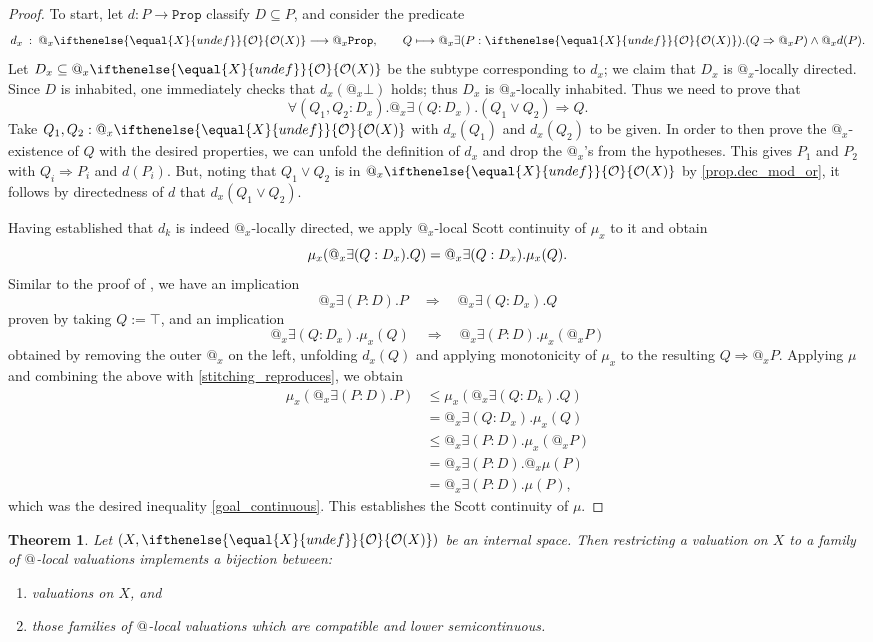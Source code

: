 \documentclass[reqno,11pt]{amsproc}
\makeatletter
\theoremstyle{plain}
\newtheorem{theorem}{Theorem}[section]
\theoremstyle{definition}
\newcommand{\Const}[1]{\mathtt{#1}}
\renewcommand{\to}[1][]{\xrightarrow{#1}}
\newcommand{\prop}{\Const{Prop}}
\newcommand{\pt}{x}
\newcommand{\Op}[1][undef]{\ifthenelse{\equal{#1}{undef}}{\mathcal{O}}{\mathcal{O}(#1)}}
\newcommand{\atsymbol}{{@}}
\newcommand{\at}[1][\pt]{\atsymbol_{#1}}
\newcommand{\imp}{\Rightarrow}
\let\originalleft\left
\let\originalright\right
\renewcommand{\left}{\mathopen{}\mathclose\bgroup\originalleft}
\renewcommand{\right}{\aftergroup\egroup\originalright}
\numberwithin{equation}{section}
\makeatother
\begin{document}
\begin{proof}
To start, let $d\colon P\to\prop$ classify $D\subseteq P$, and consider the predicate
	\[
		d_\pt \: : \: \at \Op[X] \longrightarrow \at \prop, \qquad Q \longmapsto \at \exists (P : \Op[X]) . (Q \imp \at P) \land \at d(P).
	\]
	Let $D_\pt\subseteq\at\Op[X]$ be the subtype corresponding to $d_\pt$; we claim that $D_\pt$ is $\at$-locally directed. Since $D$ is inhabited, one immediately checks that $d_\pt(\at\bot)$ holds; thus $D_\pt$ is $\at$-locally inhabited. Thus we need to prove that
\[
		\forall(Q_1, Q_2 : D_\pt ) .\at \exists (Q : D_\pt) .(Q_1 \vee Q_2)  \imp Q.
\]
	Take $Q_1, Q_2 : \at \Op[X]$ with $d_\pt(Q_1)$ and $d_\pt(Q_2)$ to be given. In order to then prove the $\at$-existence of $Q$ with the desired properties, we can unfold the definition of $d_\pt$ and drop the $\at$'s from the hypotheses. This gives $P_1$ and $P_2$ with $Q_i \imp P_i$ and $d(P_i)$. But, noting that $Q_1\lor Q_2$ is in $\at\Op[X]$ by \cref{prop.dec_mod_or}, it follows by directedness of $d$ that $d_\pt(Q_1 \lor Q_2)$.

	Having established that $d_k$ is indeed $\at$-locally directed, we apply $\at$-local Scott continuity of $\mu_\pt$ to it and obtain
\[
		\mu_\pt\left( \at \exists (Q : D_\pt). Q \right) = 
		\at \exists (Q : D_\pt) . \mu_\pt(Q).
\]
	Similar to the proof of , we have an implication
	\[
		\at \exists (P : D). P \quad \Longrightarrow \quad \at \exists (Q : D_\pt) . Q
	\]
	proven by taking $Q := \top$, and an implication
	\[
		\at \exists (Q : D_\pt) . \mu_\pt(Q) \quad \Longrightarrow \quad \at \exists (P : D) . \mu_\pt(\at P)
	\]
	obtained by removing the outer $\at$ on the left, unfolding $d_\pt(Q)$ and applying monotonicity of $\mu_\pt$ to the resulting $Q \imp \at P$. Applying $\mu$ and combining the above with \eqref{stitching_reproduces}, we obtain
	\begin{align*}
			\mu_\pt(\at \exists (P : D) . P) &\le
			\mu_\pt(\at \exists (Q : D_k). Q)\\&=
			\at \exists (Q : D_\pt).\mu_\pt(Q)\\&\leq
			\at \exists (P : D). \mu_\pt(\at P)\\&=
			\at \exists (P : D). \at\mu(P)\\&=
			\at \exists (P : D). \mu(P),
  \end{align*}
which was the desired inequality \eqref{goal_continuous}. This establishes the Scott continuity of $\mu$.
\end{proof}

\begin{theorem}
	\label{main_internal}
	Let $(X,\Op[X])$ be an internal space. Then restricting a valuation on $X$ to a family of $\at[]$-local valuations implements a bijection between:
	\begin{enumerate}
		\item valuations on $X$, and
		\item those families of $\at[]$-local valuations which are compatible and lower semicontinuous.
	\end{enumerate}
\end{theorem}
\end{document}
